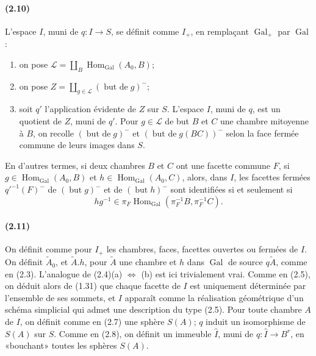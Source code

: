 \documentclass[10pt,a4paper]{article}
\newcommand{\mcL}{\mathcal L}
\begin{document}
\paragraph{(2.10)} L'espace \(I\), muni de \(q:I\to S\), se définit comme \(I_+\), en remplaçant \(\operatorname{Gal}_+\) par \(\operatorname{Gal}\):
\begin{enumerate}[label=\alph*)]
\item on pose \(\mcL=\coprod_B\operatorname{Hom}_{\operatorname{Gal}}(A_0,B)\);
\item on pose \(Z=\coprod_{g\in\mcL}(\operatorname{but\ de}g)^{-}\);
\item soit \(q'\) l'application évidente de \(Z\) sur \(S\). L'espace \(I\), muni de \(q\), est un quotient de \(Z\), muni de \(q'\). Pour \(g\in\mcL\) de but \(B\) et \(C\) une chambre mitoyenne à \(B\), on recolle \((\operatorname{but\ de}g)^{-}\) et \((\operatorname{but\ de}g(BC))^{-}\) selon la face fermée commune de leurs images dans \(S\).
\end{enumerate}
En d'autres termes, si deux chambres \(B\) et \(C\) ont une facette commune \(F\), si \(g\in\operatorname{Hom}_{\operatorname{Gal}}(A_0,B)\) et \(h\in\operatorname{Hom}_{\operatorname{Gal}}(A_0,C)\), alors, dans \(I\), les facettes fermées \(q'^{-1}(F)^{-}\) de \((\operatorname{but}g)^{-}\) et de \((\operatorname{but}h)^{-}\) sont identifiées si et seulement si
\[
hg^{-1}\in \pi_F\operatorname{Hom}_{\operatorname{Gal}}(\pi_F^{-1}B,\pi_F^{-1}C).
\]

\paragraph{(2.11)} On définit comme pour \(I_+\) les chambres, faces, facettes ouvertes ou fermées de \(I\). On définit \(\widetilde A_0\), et \(\widetilde A.h\), pour \(\widetilde A\) une chambre et \(h\) dans \(\operatorname{Gal}\) de source \(q\widetilde A\), comme en (2.3). L'analogue de (2.4)(a) \(\Leftrightarrow\) (b) est ici trivialement vrai. Comme en (2.5), on déduit alors de (1.31) que chaque facette de \(I\) est uniquement déterminée par l'ensemble de ses sommets, et \(I\) apparaît comme la réalisation géométrique d'un schéma simplicial qui admet une description du type (2.5). Pour toute chambre \(A\) de \(I\), on définit comme en (2.7) une sphère \(S(A)\); \(q\) induit un isomorphisme de \(S(A)\) sur \(S\). Comme en (2.8), on définit un immeuble \(\widehat I\), muni de \(q:\widehat I\to B^r\), en «bouchant» toutes les sphères \(S(A)\).
\end{document}
